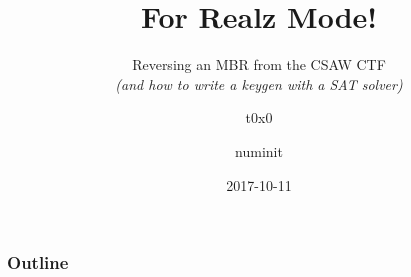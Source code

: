 \documentclass[aspectratio=169]{beamer}
\title{For Realz Mode!}
\subtitle{
    Reversing an MBR from the CSAW CTF\\
    {\em (and how to write a keygen with a SAT solver)}
}
\author{t0x0 \and numinit}
\institute{DC858, DC619, and \VaporSec}
\date{2017-10-11}
\begin{document}
\begin{frame}
    \titlepage
\end{frame}

\begin{frame}
    \frametitle{Outline}
    \tableofcontents[]
\end{frame}





\end{document}
